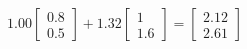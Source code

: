 \documentclass[preview]{standalone}
\begin{document}
\begin{align*}
1.00 \begin{bmatrix} 0.8 \\ 0.5 \end{bmatrix} + 1.32 \begin{bmatrix} 1 \\ 1.6 \end{bmatrix} = \begin{bmatrix} 2.12 \\ 2.61 \end{bmatrix}
\end{align*}
\end{document}
